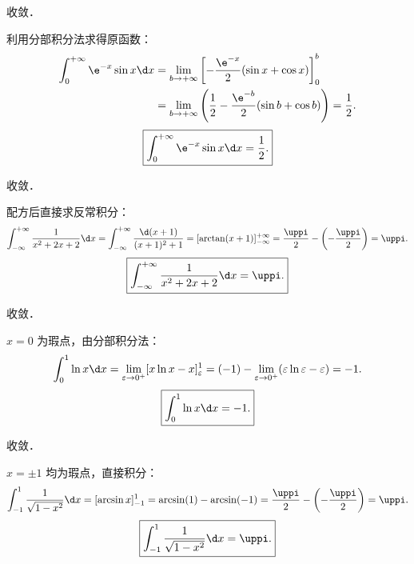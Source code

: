 \begin{solution}
     收敛．

    利用分部积分法求得原函数：
    \begin{equation}
        \begin{aligned}
            \int_0^{+\infty} \e^{-x} \sin x \d x & = \lim_{b\to +\infty} \left[ -\frac{\e^{-x}}{2}(\sin x + \cos x) \right]_0^b                         \\
                                                 & = \lim_{b\to +\infty} \left( \frac{1}{2} - \frac{\e^{-b}}{2}(\sin b + \cos b) \right) = \frac{1}{2}.
        \end{aligned}
    \end{equation}
    \begin{equation}
        \boxed{\int_0^{+\infty} \e^{-x} \sin x \d x = \frac{1}{2}.}
    \end{equation}

     收敛．

    配方后直接求反常积分：
    \begin{equation}
        \int_{-\infty}^{+\infty} \frac{1}{x^2 + 2x + 2} \d x = \int_{-\infty}^{+\infty} \frac{\d(x + 1)}{(x + 1)^2 + 1} = [\arctan(x + 1)]_{-\infty}^{+\infty} = \frac{\uppi}{2} - \left(-\frac{\uppi}{2}\right) = \uppi.
    \end{equation}
    \begin{equation}
        \boxed{\int_{-\infty}^{+\infty} \frac{1}{x^2 + 2x + 2} \d x = \uppi.}
    \end{equation}

     收敛．

    $x = 0$ 为瑕点，由分部积分法：
    \begin{equation}
        \int_0^1 \ln x \d x = \lim_{\varepsilon\to 0^+} [x\ln x - x]_\varepsilon^1 = (-1) - \lim_{\varepsilon\to 0^+} (\varepsilon\ln\varepsilon - \varepsilon) = -1.
    \end{equation}
    \begin{equation}
        \boxed{\int_0^1 \ln x \d x = -1.}
    \end{equation}

     收敛．

    $x = \pm 1$ 均为瑕点，直接积分：
    \begin{equation}
        \int_{-1}^1 \frac{1}{\sqrt{1 - x^2}} \d x = [\arcsin x]_{-1}^1 = \arcsin(1) - \arcsin(-1) = \frac{\uppi}{2} - \left(-\frac{\uppi}{2}\right) = \uppi.
    \end{equation}
    \begin{equation}
        \boxed{\int_{-1}^1 \frac{1}{\sqrt{1 - x^2}} \d x = \uppi.}
    \end{equation}


\end{solution}
